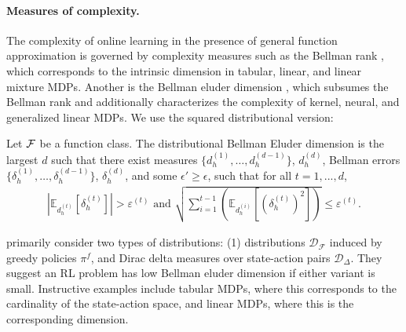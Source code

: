 \paragraph{Measures of complexity.} The complexity of online learning in the presence of general function approximation is governed by complexity measures such as the Bellman rank \citep{jiang2016contextual}, which corresponds to the intrinsic dimension in tabular, linear, and linear mixture MDPs. Another is the Bellman eluder dimension \citep{jin2021bellmaneluder}, which subsumes the Bellman rank and additionally characterizes the complexity of kernel, neural, and generalized linear MDPs. We use the squared distributional version:
\begin{defn}
    Let ${\mathcal{F}}$ be a function class. The distributional Bellman Eluder dimension is the largest $d$ such that there exist measures $\{d_h^{(1)}, \ldots, d_h^{(d-1)}\}$, $d_h^{(d)}$, Bellman errors $\{\delta_h^{(1)}, \ldots, \delta_h^{(d-1)}\}$, $\delta_h^{(d)}$, and some $\epsilon'\geq\epsilon$, such that for all $t=1,...,d$, 
    \begin{align} 
    \left|\mathbb{E}_{d_h^{(t)}}[\delta_{h}^{(t)}]\right|>\varepsilon^{(t)} \text{ and } \sqrt{\sum_{i=1}^{t-1}\left(\mathbb{E}_{d_h^{(i)}}[(\delta_{h}^{(t)})^2]\right)} \leq \varepsilon^{(t)}.
    \end{align}
\end{defn}

\cite{jin2021bellmaneluder} primarily consider two types of distributions: (1) distributions $\mathcal{D}_{\mathcal{F}}$ induced by greedy policies $\pi^f$, and Dirac delta measures over state-action pairs $\mathcal{D}_{\Delta}$. They suggest an RL problem has low Bellman eluder dimension if either variant is small. Instructive examples include tabular MDPs, where this corresponds to the cardinality of the state-action space, and linear MDPs, where this is the corresponding dimension. 

